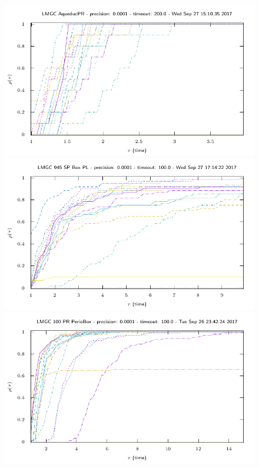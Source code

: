 \begin{figure}
  \includegraphics[width=\figwidth]{../figure/NSGS/LocalSolver/1.0e-04/200/time/profile-LMGC_AqueducPR.pdf} 
  \includegraphics[width=\figwidth]{../figure/NSGS/LocalSolver/1.0e-04/100/time/profile-LMGC_945_SP_Box_PL.pdf} 
  \includegraphics[width=\figwidth]{../figure/NSGS/LocalSolver/1.0e-04/100/time/profile-LMGC_100_PR_PerioBox.pdf} 

\end{figure}
